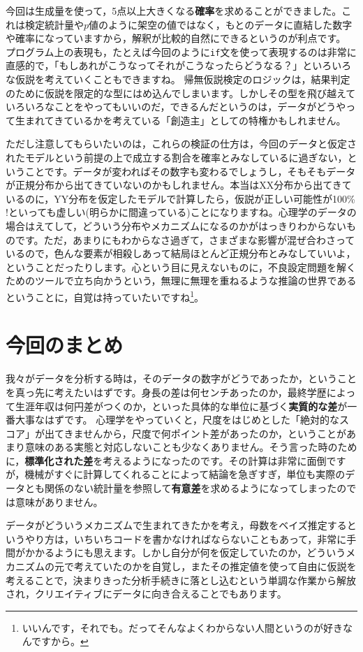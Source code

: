 \documentclass{ltjsbook}
\begin{document}
今回は生成量を使って，5点以上大きくなる\textbf{確率}を求めることができました。これは検定統計量や$p$値のように架空の値ではなく，もとのデータに直結した数字や確率になっていますから，解釈が比較的自然にできるというのが利点です。
プログラム上の表現も，たとえば今回のように\texttt{if}文を使って表現するのは非常に直感的で，「もしあれがこうなってそれがこうなったらどうなる？」といろいろな仮説を考えていくこともできますね。
帰無仮説検定のロジックは，結果判定のために仮説を限定的な型にはめ込んでしまいます。しかしその型を飛び越えていろいろなことをやってもいいのだ，できるんだというのは，データがどうやって生まれてきているかを考えている「創造主」としての特権かもしれません。

ただし注意してもらいたいのは，これらの検証の仕方は，今回のデータと仮定されたモデルという前提の上で成立する割合を確率とみなしているに過ぎない，ということです。データが変わればその数字も変わるでしょうし，そもそもデータが正規分布から出てきていないのかもしれません。本当はXX分布から出てきているのに，YY分布を仮定したモデルで計算したら，仮説が正しい可能性が100\% !といっても虚しい(明らかに間違っている)ことになりますね。心理学のデータの場合はえてして，どういう分布やメカニズムになるのかがはっきりわからないものです。ただ，あまりにもわからなさ過ぎて，さまざまな影響が混ぜ合わさっているので，色んな要素が相殺しあって結局ほとんど正規分布とみなしていいよ，ということだったりします。心という目に見えないものに，不良設定問題を解くためのツールで立ち向かうという，無理に無理を重ねるような推論の世界であるということに，自覚は持っていたいですね\footnote{いいんです，それでも。だってそんなよくわからない人間というのが好きなんですから。}。


\section{今回のまとめ}
我々がデータを分析する時は，そのデータの数字がどうであったか，ということを真っ先に考えたいはずです。身長の差は何センチあったのか，最終学歴によって生涯年収は何円差がつくのか，といった具体的な単位に基づく\textbf{実質的な差}が一番大事なはずです。
心理学をやっていくと，尺度をはじめとした「絶対的なスコア」が出てきませんから，尺度で何ポイント差があったのか，ということがあまり意味のある実態と対応しないことも少なくありません。そう言った時のために，\textbf{標準化された差}を考えるようになったのです。その計算は非常に面倒ですが，機械がすぐに計算してくれることによって結論を急ぎすぎ，単位も実際のデータとも関係のない統計量を参照して\textbf{有意差}を求めるようになってしまったのでは意味がありません。

データがどういうメカニズムで生まれてきたかを考え，母数をベイズ推定するというやり方は，いちいちコードを書かなければならないこともあって，非常に手間がかかるようにも思えます。しかし自分が何を仮定していたのか，どういうメカニズムの元で考えていたのかを自覚し，またその推定値を使って自由に仮説を考えることで，決まりきった分析手続きに落とし込むという単調な作業から解放され，クリエイティブにデータに向き合えることでもあります。
\end{document}
